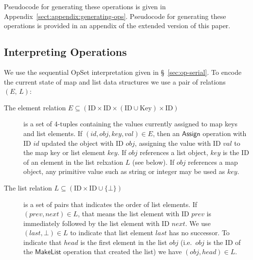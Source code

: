 \ifarxiv
  \noindent
  Pseudocode for generating these operations is given in Appendix~\ref{sect:appendix:generating-ops}.
\else
  \noindent
  Pseudocode for generating these operations is provided in an appendix of the extended version of this paper.
\fi


\subsection{Interpreting Operations}\label{sec:datatypes-interp}

We use the sequential OpSet interpretation given in \S~\ref{sec:op-serial}.
To encode the current state of map and list data structures we use a pair of relations $(E,\, L)$:

\begin{description}
    \item[The element relation $E \subseteq (\mathrm{ID} \times \mathrm{ID} \times (\mathrm{ID} \cup \mathrm{Key}) \times \mathrm{ID})$]
        is a set of 4-tuples containing the values currently assigned to map keys and list elements.
        If $(\mathit{id}, \mathit{obj}, \mathit{key}, \mathit{val}) \in E$, then an $\mathsf{Assign}$ operation with ID $\mathit{id}$ updated the object with ID $\mathit{obj}$, assigning the value with ID $\mathit{val}$ to the map key or list element $\mathit{key}$.
        If $\mathit{obj}$ references a list object, $\mathit{key}$ is the ID of an element in the list relxation $L$ (see below).
        If $\mathit{obj}$ references a map object, any primitive value such as string or integer may be used as $\mathit{key}$.
      \item[The list relation $L \subseteq (\mathrm{ID} \times \mathrm{ID} \cup \{\bot\})$] is a set of pairs that indicates the order of list elements.
        If $(\mathit{prev}, \mathit{next}) \in L$, that means the list element with ID $\mathit{prev}$ is immediately followed by the list element with ID $\mathit{next}$.
        We use $(\mathit{last}, \bot) \in L$ to indicate that list element $\mathit{last}$ has no successor.
        To indicate that $\mathit{head}$ is the first element in the list $\mathit{obj}$ (i.e.\ $\mathit{obj}$ is the ID of the $\mathsf{MakeList}$ operation that created the list) we have $(\mathit{obj}, \mathit{head}) \in L$.
\end{description}

